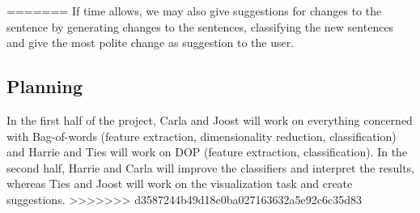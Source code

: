 \documentclass[11pt, english]{article}
\begin{document}
=======
If time allows, we may also give suggestions for changes to the sentence by generating changes to the sentences, classifying the new sentences and give the most polite change as suggestion to the user.

\subsection*{Planning}
In the first half of the project, Carla and Joost will work on everything concerned with Bag-of-words (feature extraction, dimensionality reduction, classification) and Harrie and Ties will work on DOP (feature extraction, classification). In the second half, Harrie and Carla will improve the classifiers and interpret the results, whereas Ties and Joost will work on the visualization task and create suggestions.  
>>>>>>> d3587244b49d18c0ba027163632a5e92c6c35d83
\end{document}
